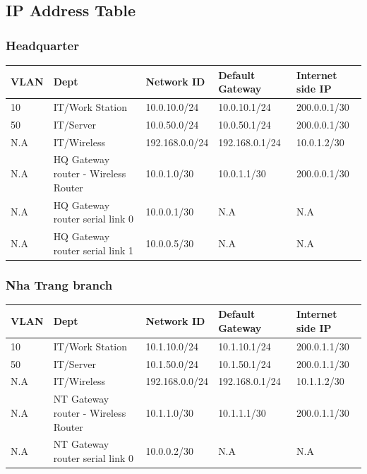 \subsection{IP Address Table}
\subsubsection{Headquarter}
\begin{center}
  \begin{tabular}{|p{}|p{}|p{}|p{}|p{}|}
  \hline
   VLAN & Dept & Network ID & Default Gateway & Internet side IP\\
   \hline
   10 & IT/Work Station & 10.0.10.0/24 & 10.0.10.1/24 & 200.0.0.1/30 \\
   \hline
   50 & IT/Server & 10.0.50.0/24 & 10.0.50.1/24 & 200.0.0.1/30\\
   \hline
   N.A & IT/Wireless & 192.168.0.0/24 & 192.168.0.1/24 & 10.0.1.2/30\\
   \hline
    N.A & HQ Gateway router - Wireless Router
&10.0.1.0/30
&10.0.1.1/30
&200.0.0.1/30
\\
\hline
N.A & HQ Gateway router serial link 0
&10.0.0.1/30
&N.A
&N.A\\
\hline
N.A & HQ Gateway router serial link 1
&10.0.0.5/30
&N.A
&N.A
\\
\hline
   \end{tabular}
\end{center}
\subsubsection{Nha Trang branch}
\begin{center}
  \begin{tabular}{|p{}|p{}|p{}|p{}|p{}|}
  \hline
   VLAN & Dept & Network ID & Default Gateway & Internet side IP\\
   \hline
   10 & IT/Work Station
&10.1.10.0/24
&10.1.10.1/24
&200.0.1.1/30
 \\
 \hline
 50 & IT/Server
&10.1.50.0/24
&10.1.50.1/24
&200.0.1.1/30
\\
\hline
N.A &     IT/Wireless
&192.168.0.0/24
&192.168.0.1/24
&10.1.1.2/30
\\
\hline
N.A & NT Gateway router - Wireless Router
&10.1.1.0/30
&10.1.1.1/30
&200.0.1.1/30
\\
\hline
N.A & NT Gateway router serial link 0
&10.0.0.2/30
&N.A
&N.A
\\
\hline
   \end{tabular}
\end{center}

